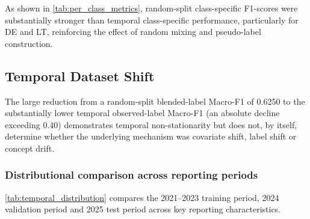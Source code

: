 \documentclass[10pt]{article}
\begin{document}
As shown in \cref{tab:per_class_metrics}, random-split class-specific F1-scores were substantially stronger than temporal class-specific performance, particularly for DE and LT, reinforcing the effect of random mixing and pseudo-label construction.


\subsection{Temporal Dataset Shift}
\label{sec:temporal_dataset_shift}

The large reduction from a random-split blended-label Macro-F1 of 0.6250 to the substantially lower temporal observed-label Macro-F1 (an absolute decline exceeding 0.40) demonstrates temporal non-stationarity but does not, by itself, determine whether the underlying mechanism was covariate shift, label shift or concept drift.

\subsubsection{Distributional comparison across reporting periods}

\cref{tab:temporal_distribution} compares the 2021--2023 training period, 2024 validation period and 2025 test period across key reporting characteristics.
\end{document}
